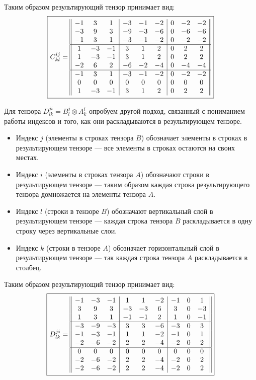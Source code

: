 \documentclass{article}
\newcommand*\squared[1]{\tikz[baseline=(char.base)]{
            \node[shape=rectangle,draw,inner sep=4pt] (char) {#1};}}
\begin{document}
\begin{center}
Таким образом результирующий тензор принимает вид:
$$\squared{$C^{ij}_{kl} = \begin{array}{||ccc|ccc|ccc||}
-1 & 3 & 1 & -3 & -1 & -2 & 0 & -2 & -2 \\
-3 & 9 & 3 & -9 & -3 & -6 & 0 & -6 & -6 \\
-1 & 3 & 1 & -3 & -1 & -2 & 0 & -2 & -2 \\
\hline
1 & -3 & -1 & 3 & 1 & 2 & 0 & 2 & 2 \\
1 & -3 & -1 & 3 & 1 & 2 & 0 & 2 & 2 \\
-2 & 6 & 2 & -6 & -2 & -4 & 0 & -4 & -4 \\
\hline
-1 & 3 & 1 & -3 & -1 & -2 & 0 & -2 & -2 \\
0 & 0 & 0 & 0 & 0 & 0 & 0 & 0 & 0 \\
1 & -3 & -1 & 3 & 1 & 2 & 0 & 2 & 2 \\
\end{array}$}
$$
\end{center}
Для тензора $D^{ji}_{lk} = B^j_l \otimes A^i_k$ опробуем другой подход, связанный с пониманием работы индексов и того, как они раскладываются в результирующем тензоре.
\begin{itemize}
\item Индекс $j$ (элементы в строках тензора $B$) обозначает элементы в строках в результирующем тензоре --- все элементы в строках остаются на своих местах.
\item Индекс $i$ (элементы в строках тензора $A$) обозначают строки в результирующем тензоре --- таким образом каждая строка результирующего тензора домножается на элементы тензора $A$.
\item Индекс $l$ (строки в тензоре $B$) обозначают вертикальный слой в результирующем тензоре --- каждая строка тензора $B$ раскладывается в одну строку через вертикальные слои.
\item Индекс $k$ (строки в тензоре $A$) обозначает горизонтальный слой в результирующем тензоре --- так каждая строка тензора $A$ раскладывается в столбец.
\end{itemize}
\begin{center}
Таким образом результирующий тензор принимает вид:
$$\squared{$D^{ji}_{lk} = \begin{array}{||ccc|ccc|ccc||}
-1 & -3 & -1 & 1 & 1 & -2 & -1 & 0 & 1 \\
3 & 9 & 3 & -3 & -3 & 6 & 3 & 0 & -3 \\
1 & 3 & 1 & -1 & -1 & 2 & 1 & 0 & -1 \\
\hline
-3 & -9 & -3 & 3 & 3 & -6 & -3 & 0 & 3 \\
-1 & -3 & -1 & 1 & 1 & -2 & -1 & 0 & 1 \\
-2 & -6 & -2 & 2 & 2 & -4 & -2 & 0 & 2 \\
\hline
0 & 0 & 0 & 0 & 0 & 0 & 0 & 0 & 0 \\
-2 & -6 & -2 & 2 & 2 & -4 & -2 & 0 & 2 \\
-2 & -6 & -2 & 2 & 2 & -4 & -2 & 0 & 2
\end{array}$}$$
\end{center}
\end{document}
